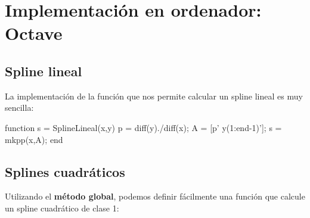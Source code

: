 \documentclass[11pt,spanish,]{article}
\newenvironment{Shaded}{}{}
\newcommand{\FloatTok}[1]{\textcolor[rgb]{0.25,0.63,0.44}{{#1}}}
\newcommand{\FunctionTok}[1]{\textcolor[rgb]{0.02,0.16,0.49}{{#1}}}
\newcommand{\NormalTok}[1]{{#1}}
\theoremstyle{definition} \newtheorem*{definicion}{Definición}
\begin{document}
\pagebreak

\section{Implementación en ordenador:
Octave}\label{implementaciuxf3n-en-ordenador-octave}

\subsection{Spline lineal}\label{spline-lineal}

La implementación de la función que nos permite calcular un spline
lineal es muy sencilla:

\begin{Shaded}
\begin{Highlighting}[]
\NormalTok{function s = SplineLineal(x,y)}
  \NormalTok{p = }\FunctionTok{diff}\NormalTok{(y)./}\FunctionTok{diff}\NormalTok{(x);}
  \NormalTok{A = [p' y(}\FloatTok{1}\NormalTok{:end-}\FloatTok{1}\NormalTok{)'];}
  \NormalTok{s = }\FunctionTok{mkpp}\NormalTok{(x,A);}
\NormalTok{end}
\end{Highlighting}
\end{Shaded}

\subsection{Splines cuadráticos}\label{splines-cuadruxe1ticos-1}

Utilizando el \textbf{método global}, podemos definir fácilmente una
función que calcule un spline cuadrático de clase 1:
\end{document}

